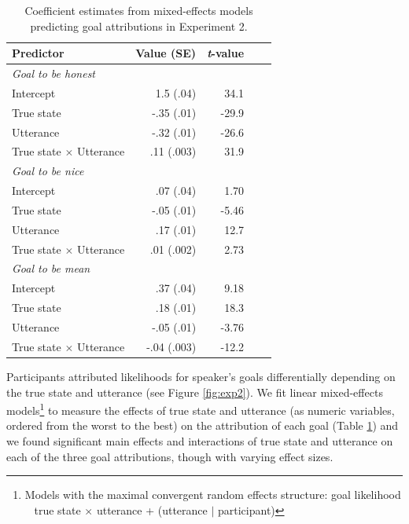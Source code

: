 \documentclass[10pt,letterpaper]{article}
\newcommand{\ndg}[1]{\textcolor{Green}{[ndg: #1]}}
\begin{document}
\begin{table}[t]
\caption{\label{tab:lmer1}  Coefficient estimates from mixed-effects models predicting goal attributions in Experiment 2.} 
\begin{center} 
\begin{tabular}{l r r r l} 
\hline
Predictor  &  Value (SE) & \emph{t}-value\\
\hline
\emph{Goal to be honest} \\
Intercept  & 1.5 (.04) & 34.1 \\
True state & -.35 (.01) &  -29.9 \\
Utterance & -.32 (.01) & -26.6 \\
True state $\times$ Utterance & .11 (.003) & 31.9 \\
\emph{Goal to be nice} \\
Intercept  & .07 (.04) & 1.70\\
True state & -.05 (.01) &  -5.46 \\
Utterance & .17 (.01) & 12.7 \\
True state $\times$ Utterance & .01 (.002) & 2.73 \\
\emph{Goal to be mean} \\ 
Intercept  & .37 (.04) & 9.18 \\
True state & .18 (.01) &  18.3 \\
Utterance & -.05 (.01) & -3.76 \\
True state $\times$ Utterance & -.04 (.003) & -12.2 \\
\hline
\end{tabular} 
\end{center} 
\end{table}


Participants attributed likelihoods for speaker's goals differentially depending on the true state and utterance (see Figure \ref{fig:exp2}). We fit linear mixed-effects models\footnote{Models with the maximal convergent random effects structure: goal likelihood ~ true state $\times$ utterance + (utterance $|$ participant)} to measure the effects of true state and utterance (as numeric variables, ordered from the worst to the best) on the attribution of each goal (Table \ref{tab:lmer1}) and we found significant main effects and interactions of true state and utterance on each of the three goal attributions, though with varying effect sizes. 
\end{document}
